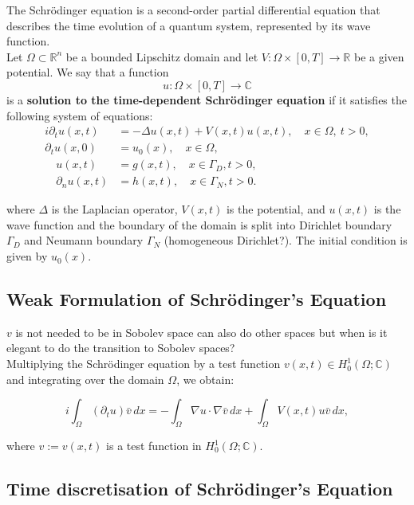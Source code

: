 \documentclass{article}
\theoremstyle{definition}
\theoremstyle{plain}
\theoremstyle{remark}
\begin{document}
The Schrödinger equation is a second-order partial differential equation that describes the time evolution of a quantum system, represented by its wave function. \\
Let $\Omega \subset \mathbb{R}^n$ be a bounded Lipschitz domain and let $V : \Omega \times [0,T] \to \mathbb{R}$ be a given potential. We say that a function
\[
u : \Omega \times [0,T] \to \mathbb{C}
\]
is a \textbf{solution to the time-dependent Schrödinger equation} if it satisfies the following system of equations:
\begin{align}
    i \partial_t u(x,t) &= - \Delta u(x,t) + V(x,t) u(x,t), \quad x \in \Omega, \ t > 0,\\
    \partial_t u(x,0) &= u_0(x), \quad x \in \Omega,\\
    \quad u(x,t) &= g(x,t), \quad x \in \Gamma_D, t>0,\\
    \quad \partial_n u(x,t) &= h(x,t), \quad x \in \Gamma_N, t> 0.
\end{align}


where $\Delta$ is the Laplacian operator, $V(x,t)$ is the potential, and $u(x,t)$ is the wave function and the boundary of the domain is split into Dirichlet boundary $\Gamma_D$ and Neumann boundary $\Gamma_N$ (homogeneous Dirichlet?). 
The initial condition is given by $u_0(x)$.

\subsection*{Weak Formulation of Schrödinger's Equation}

$v$ is not needed to be in Sobolev space can also do other spaces but when is it elegant to do the transition to Sobolev spaces? \\
Multiplying the Schrödinger equation by a test function $v(x,t) \in H_0^1(\Omega; \mathbb{C})$ and integrating over the domain $\Omega$, we obtain:

\begin{equation}
    i \int_{\Omega} \left( \partial_t u \right) \bar{v} \, dx = - \int_{\Omega} \nabla u \cdot \nabla \bar{v} \, dx + \int_{\Omega} V(x,t) u \bar{v} \, dx,
\end{equation}

where $v := v(x,t)$ is a test function in $H_0^1(\Omega; \mathbb{C})$.

\subsection*{Time discretisation of Schrödinger's Equation}
\end{document}
